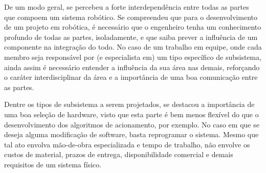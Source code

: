 De um modo geral, se percebeu a forte interdependência entre todas as partes que compoem um sistema robótico. Se compreendeu que para o desenvolvimento de um projeto em robótica, é necessário que o engenheiro tenha um conhecimento profundo de todas as partes, isoladamente, e que saiba prever a influência de um componente na integração do todo. No caso de um trabalho em equipe, onde cada membro seja responsável por (e especialista em) um tipo específico de subsistema, ainda assim é necessário entender a influência da sua área nas demais, reforçando o caráter interdisciplinar da área e a importância de uma boa comunicação entre as partes.

Dentre os tipos de subsistema a serem projetados, se destacou a importância de uma boa seleção de hardware, visto que esta parte é bem menos flexível do que o desenvolvimento dos algoritmos de acionamento, por exemplo. No caso em que se deseja alguma modificação de software, basta reprogramar o sistema. Mesmo que tal ato envolva mão-de-obra especializada e tempo de trabalho, não envolve os custos de material, prazos de entrega, disponibilidade comercial e demais requisitos de um sistema físico.
